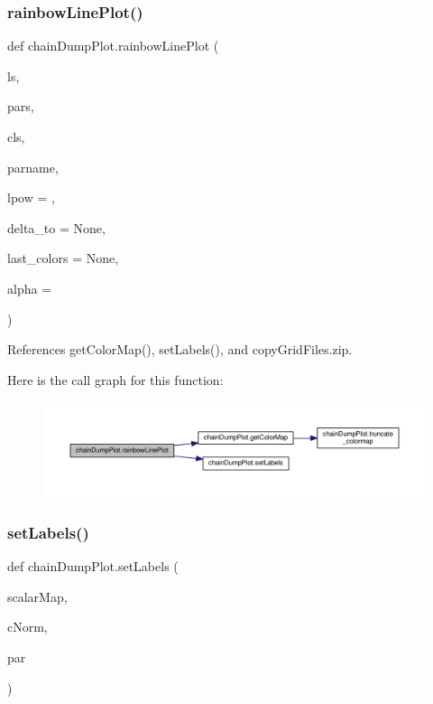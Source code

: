 \subsubsection{\texorpdfstring{rainbow\+Line\+Plot()}{rainbowLinePlot()}}
{\footnotesize\ttfamily def chain\+Dump\+Plot.\+rainbow\+Line\+Plot (\begin{DoxyParamCaption}\item[{}]{ls,  }\item[{}]{pars,  }\item[{}]{cls,  }\item[{}]{parname,  }\item[{}]{lpow = {},  }\item[{}]{delta\+\_\+to = {\ttfamily None},  }\item[{}]{last\+\_\+colors = {\ttfamily None},  }\item[{}]{alpha = {} }\end{DoxyParamCaption})}



References get\+Color\+Map(), set\+Labels(), and copy\+Grid\+Files.\+zip.

Here is the call graph for this function\+:
\nopagebreak
\begin{figure}[H]
\begin{center}
\leavevmode
\includegraphics[width=350pt]{namespacechainDumpPlot_a545569f988e5fb4e1743898514441b06_cgraph}
\end{center}
\end{figure}
\mbox{\label{namespacechainDumpPlot_ad7ceae1d45162491d4aded137ea0d167}} 
\subsubsection{\texorpdfstring{set\+Labels()}{setLabels()}}
{\footnotesize\ttfamily def chain\+Dump\+Plot.\+set\+Labels (\begin{DoxyParamCaption}\item[{}]{scalar\+Map,  }\item[{}]{c\+Norm,  }\item[{}]{par }\end{DoxyParamCaption})}



